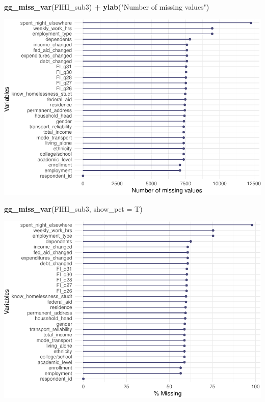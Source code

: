 \documentclass[
  10pt,
]{article}
\newenvironment{Shaded}{\begin{snugshade}}{\end{snugshade}}
\newcommand{\DataTypeTok}[1]{\textcolor[rgb]{0.13,0.29,0.53}{#1}}
\newcommand{\KeywordTok}[1]{\textcolor[rgb]{0.13,0.29,0.53}{\textbf{#1}}}
\newcommand{\NormalTok}[1]{#1}
\newcommand{\OperatorTok}[1]{\textcolor[rgb]{0.81,0.36,0.00}{\textbf{#1}}}
\newcommand{\StringTok}[1]{\textcolor[rgb]{0.31,0.60,0.02}{#1}}
\begin{document}
\begin{Shaded}
\begin{Highlighting}[]
\KeywordTok{gg_miss_var}\NormalTok{(FIHI_sub3) }\OperatorTok{+}\StringTok{ }\KeywordTok{ylab}\NormalTok{(}\StringTok{"Number of missing values"}\NormalTok{)}
\end{Highlighting}
\end{Shaded}

\includegraphics{phase1_report_files/figure-latex/unnamed-chunk-4-2}

\begin{Shaded}
\begin{Highlighting}[]
\KeywordTok{gg_miss_var}\NormalTok{(FIHI_sub3, }\DataTypeTok{show_pct =}\NormalTok{ T) }
\end{Highlighting}
\end{Shaded}

\includegraphics{phase1_report_files/figure-latex/unnamed-chunk-4-3}
\end{document}
